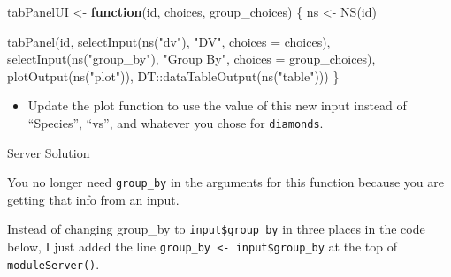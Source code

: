 \documentclass[
  oneside]{book}
\newenvironment{Shaded}{\begin{snugshade}}{\end{snugshade}}
\newcommand{\AttributeTok}[1]{\textcolor[rgb]{0.77,0.63,0.00}{#1}}
\newcommand{\CommentTok}[1]{\textcolor[rgb]{0.56,0.35,0.01}{\textit{#1}}}
\newcommand{\ControlFlowTok}[1]{\textcolor[rgb]{0.13,0.29,0.53}{\textbf{#1}}}
\newcommand{\FunctionTok}[1]{\textcolor[rgb]{0.00,0.00,0.00}{#1}}
\newcommand{\NormalTok}[1]{#1}
\newcommand{\OtherTok}[1]{\textcolor[rgb]{0.56,0.35,0.01}{#1}}
\newcommand{\SpecialCharTok}[1]{\textcolor[rgb]{0.00,0.00,0.00}{#1}}
\newcommand{\StringTok}[1]{\textcolor[rgb]{0.31,0.60,0.02}{#1}}
\providecommand{\tightlist}{%
  \setlength{\itemsep}{0pt}\setlength{\parskip}{0pt}}
\begin{document}
\begin{Shaded}
\begin{Highlighting}[]
\NormalTok{tabPanelUI }\OtherTok{\textless{}{-}} \ControlFlowTok{function}\NormalTok{(id, choices, group\_choices) \{}
\NormalTok{    ns }\OtherTok{\textless{}{-}} \FunctionTok{NS}\NormalTok{(id)}

    \FunctionTok{tabPanel}\NormalTok{(id, }\FunctionTok{selectInput}\NormalTok{(}\FunctionTok{ns}\NormalTok{(}\StringTok{"dv"}\NormalTok{), }\StringTok{"DV"}\NormalTok{, }\AttributeTok{choices =}\NormalTok{ choices), }\FunctionTok{selectInput}\NormalTok{(}\FunctionTok{ns}\NormalTok{(}\StringTok{"group\_by"}\NormalTok{),}
        \StringTok{"Group By"}\NormalTok{, }\AttributeTok{choices =}\NormalTok{ group\_choices), }\FunctionTok{plotOutput}\NormalTok{(}\FunctionTok{ns}\NormalTok{(}\StringTok{"plot"}\NormalTok{)), DT}\SpecialCharTok{::}\FunctionTok{dataTableOutput}\NormalTok{(}\FunctionTok{ns}\NormalTok{(}\StringTok{"table"}\NormalTok{)))}
\NormalTok{\}}
\end{Highlighting}
\end{Shaded}

\begin{itemize}
\tightlist
\item
  Update the plot function to use the value of this new input instead of ``Species'', ``vs'', and whatever you chose for \texttt{diamonds}.
\end{itemize}

Server Solution

You no longer need \texttt{group\_by} in the arguments for this function because you are getting that info from an input.

Instead of changing \AttributeTok{group\_by} to \texttt{input\$group\_by} in three places in the code below, I just added the line \texttt{group\_by\ \textless{}-\ input\$group\_by} at the top of \texttt{moduleServer}\texttt{()}.

\begin{Shaded}
\end{Shaded}
\end{document}
